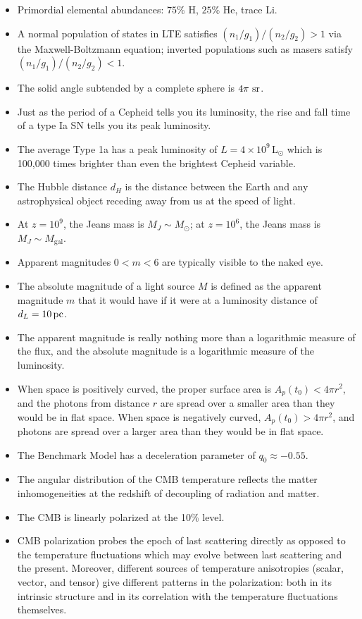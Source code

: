 \documentclass[a4paper,11pt]{article}
\begin{document}
\begin{itemize}
    \item Primordial elemental abundances: $75\%$ H, $25\%$ He, trace Li.
    \item A normal population of states in LTE satisfies $(n_1/g_1)/(n_2/g_2)>1$ via the Maxwell-Boltzmann equation; inverted populations such as masers satisfy $(n_1/g_1)/(n_2/g_2)<1$.
    \item The solid angle subtended by a complete sphere is $4\pi~{\rm sr}$.
    \item Just as the period of a Cepheid tells you its luminosity, the rise and fall time of a type Ia SN tells you its peak luminosity.
    \item The average Type 1a has a peak luminosity of $L=4\times10^9\,\mathrm{L}_\odot$ which is 100,000 times brighter than even the brightest Cepheid variable.
    \item The Hubble distance $d_H$ is the distance between the Earth and any astrophysical object receding away from us at the speed of light.
    \item At $z=10^9$, the Jeans mass is $M_J\sim M_\odot$; at $z=10^6$, the Jeans mass is $M_J\sim M_\mathrm{gal}$.
    \item Apparent magnitudes $0<m<6$ are typically visible to the naked eye.
    \item The absolute magnitude of a light source $M$ is defined as the apparent magnitude $m$ that it would have if it were at a luminosity distance of $d_L = 10\,{\rm pc}$.
    \item The apparent magnitude is really nothing more than a logarithmic measure of the flux, and the absolute magnitude is a logarithmic measure of the luminosity.
    \item When space is positively curved, the proper surface area is $A_p(t_0) < 4\pi r^2$, and the photons from distance $r$ are spread over a smaller area than they would be in flat space. When space is negatively curved, $A_p(t_0) > 4\pi r^2$, and photons are spread over a larger area than they would be in flat space.
    \item The Benchmark Model has a deceleration parameter of $q_0\approx−0.55$.
    \item The angular distribution of the CMB temperature reflects the matter inhomogeneities at the redshift of decoupling of radiation and matter.
    \item The CMB is linearly polarized at the 10\% level.
    \item CMB polarization probes the epoch of last scattering directly as opposed to the temperature fluctuations which may evolve between last scattering and the present. Moreover, different sources of temperature anisotropies (scalar, vector, and tensor) give different patterns in the polarization: both in its intrinsic structure and in its correlation with the temperature fluctuations themselves.

\end{itemize}
\end{document}
